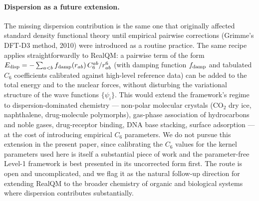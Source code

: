 \documentclass[11pt]{article}
\begin{document}
\paragraph{Dispersion as a future extension.}
The missing dispersion contribution is the same one that originally affected standard density functional theory until empirical pairwise corrections (Grimme's DFT-D3 method, 2010) were introduced as a routine practice. The same recipe applies straightforwardly to RealQM: a pairwise term of the form $E_{\rm disp} = -\sum_{a<b} f_{\rm damp}(r_{ab})\, C_6^{ab}/r_{ab}^6$ (with damping function $f_{\rm damp}$ and tabulated $C_6$ coefficients calibrated against high-level reference data) can be added to the total energy and to the nuclear forces, without disturbing the variational structure of the wave functions $\{\psi_i\}$. This would extend the framework's regime to dispersion-dominated chemistry --- non-polar molecular crystals (CO$_2$ dry ice, naphthalene, drug-molecule polymorphs), gas-phase association of hydrocarbons and noble gases, drug-receptor binding, DNA base stacking, surface adsorption --- at the cost of introducing empirical $C_6$ parameters. We do not pursue this extension in the present paper, since calibrating the $C_6$ values for the kernel parameters used here is itself a substantial piece of work and the parameter-free Level-1 framework is best presented in its uncorrected form first. The route is open and uncomplicated, and we flag it as the natural follow-up direction for extending RealQM to the broader chemistry of organic and biological systems where dispersion contributes substantially.
\end{document}
